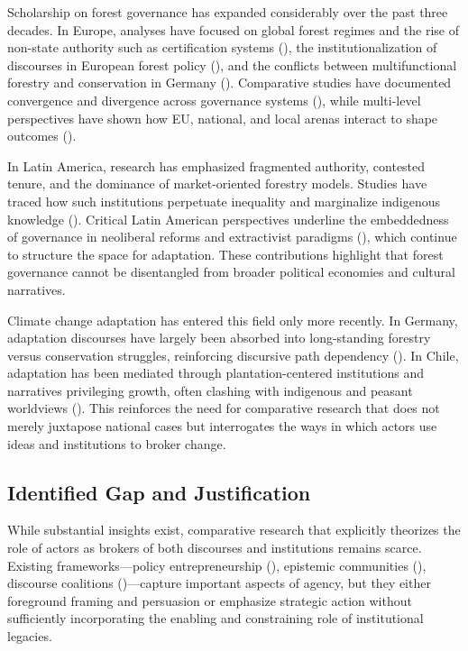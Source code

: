 Scholarship on forest governance has expanded considerably over the past three decades. 
In Europe, analyses have focused on global forest regimes and the rise of 
non-state authority such as certification systems (\citealp{Cashore2004}), 
the institutionalization of discourses in European forest policy 
(\citealp{ArtsBuizer2009}), and the conflicts between multifunctional forestry 
and conservation in Germany (\citealp{Winkel2011}). Comparative studies have 
documented convergence and divergence across governance systems 
(\citealp{HowlettRayner2006}), while multi-level perspectives have shown how 
EU, national, and local arenas interact to shape outcomes (\citealp{Arts2006,Pulzl2013}). 

In Latin America, research has emphasized fragmented authority, contested tenure, 
and the dominance of market-oriented forestry models. Studies have traced how 
such institutions perpetuate inequality and marginalize indigenous knowledge 
(\citealp{LarsonRibot2007,AnderssonPacheco2006,Manuschevich2016}). 
Critical Latin American perspectives underline the embeddedness of governance 
in neoliberal reforms and extractivist paradigms (\citealp{Gudynas2011,Escobar1996}), 
which continue to structure the space for adaptation. These contributions highlight 
that forest governance cannot be disentangled from broader political economies 
and cultural narratives.

Climate change adaptation has entered this field only more recently. In Germany, 
adaptation discourses have largely been absorbed into long-standing forestry versus 
conservation struggles, reinforcing discursive path dependency (\citealp{Winkel2011}). 
In Chile, adaptation has been mediated through plantation-centered institutions 
and narratives privileging growth, often clashing with indigenous and peasant 
worldviews (\citealp{Manuschevich2016}). This reinforces the need for comparative 
research that does not merely juxtapose national cases but interrogates the ways 
in which actors use ideas and institutions to broker change.

\subsection*{Identified Gap and Justification}

While substantial insights exist, comparative research that explicitly theorizes 
the role of actors as brokers of both discourses and institutions remains scarce. 
Existing frameworks—policy entrepreneurship (\citealp{Kingdon1995,MintromNorman2009}), 
epistemic communities (\citealp{Haas1992}), discourse coalitions (\citealp{Hajer1995})—capture 
important aspects of agency, but they either foreground framing and persuasion 
or emphasize strategic action without sufficiently incorporating the enabling 
and constraining role of institutional legacies. 

